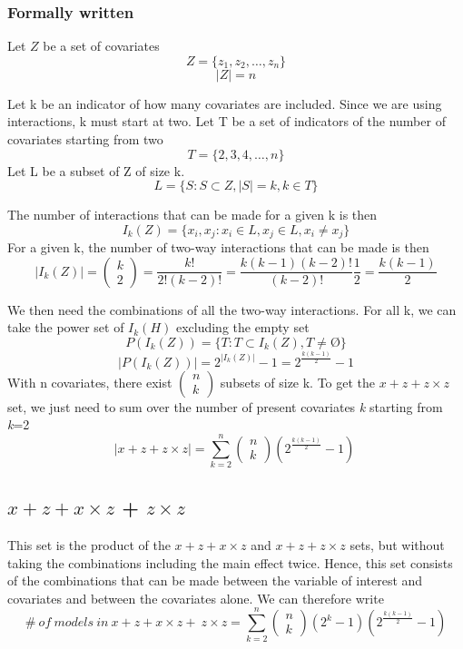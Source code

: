 \subsubsection{Formally written}
Let $Z$ be a set of covariates 
\[Z=\{\left.z_1,z_2,\dots ,z_n\right.\}\] 
\[|Z|=n\] 

Let k be an indicator of how many covariates are included. Since we are using interactions, k must start at two. Let T be a set of indicators of the number of covariates starting from two
\[T=\{\left.2,3,4,\dots ,n\right.\}\] 
Let L be a subset of Z of size k.
\[L=\{\left.S:S\subset Z,\left|S\right|=k,k\in T\right.\}\] 

\noindent The number of interactions that can be made for a given k is then
\[I_k\left(Z\right)=\{\left.\left.x_i,x_j\right.:x_i\in L,x_j\in L,x_i\neq x_j\right.\}\] 
For a given k, the number of two-way interactions that can be made is then
\[\left|I_k\left(Z\right)\right|=\left( \begin{array}{c}
k \\ 
2 \end{array}
\right)=\frac{k!}{2!\left(k-2\right)!}=\frac{k\left(k-1\right)\left(k-2\right)!}{\left(k-2\right)!}\frac{1}{2}=\frac{k\left(k-1\right)}{2}\] 

We then need the combinations of all the two-way interactions. For all k, we can take the power set of $I_k\left(H\right)$ excluding the empty set
\[P\left(I_k\left(Z\right)\right)=\{\left.T:T\subset I_k\left(Z\right),T\neq \textrm{\O}\right.\}\] 
\[\left|P\left(I_k\left(Z\right)\right)\right|=2^{\left|I_k\left(Z\right)\right|}-1=2^{\frac{k\left(k-1\right)}{2}}-1\] 
With n covariates, there exist $\left( \begin{array}{c}
n \\ 
k \end{array}
\right)$ subsets of size k. To get the $x + z + z \times z$ set, we just need to sum over the number of present covariates \textit{k} starting from \textit{k}=2
\[\left|x + z+z \times z\right|=\sum^n_{k=2}{\left( \begin{array}{c}
n \\ 
k \end{array}
\right)}\left(2^{\frac{k\left(k-1\right)}{2}}-1\right)\ \] 

\subsection{$x + z + x \times z$ + $z \times z$}
This set is the product of the $x + z + x \times z$ and $x + z + z \times z$ sets, but without taking the combinations including the main effect twice. Hence, this set consists of the combinations that can be made between the variable of interest and covariates and between the covariates alone. We can therefore write 
\[\#\ of\ models\ in\ x + z + x \times z+\ z \times z=\sum^n_{k=2}{\left( \begin{array}{c}
n \\ 
k \end{array}
\right)\left(2^k-1\right)\left(2^{\frac{k\left(k-1\right)}{2}}-1\right)}\] 

